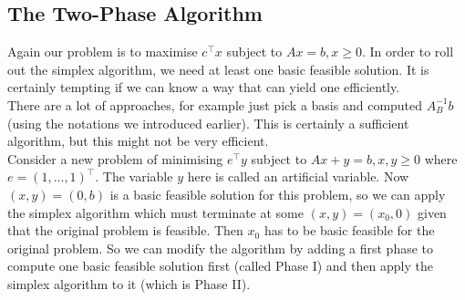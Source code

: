 \subsection{The Two-Phase Algorithm}
Again our problem is to maximise $c^\top x$ subject to $Ax=b,x\ge 0$.
In order to roll out the simplex algorithm, we need at least one basic feasible solution.
It is certainly tempting if we can know a way that can yield one efficiently.\\
There are a lot of approaches, for example just pick a basis and computed $A_B^{-1}b$ (using the notations we introduced earlier).
This is certainly a sufficient algorithm, but this might not be very efficient.\\
Consider a new problem of minimising $e^\top y$ subject to $Ax+y=b,x,y\ge 0$ where $e=(1,\ldots,1)^\top$.
The variable $y$ here is called an artificial variable.
Now $(x,y)=(0,b)$ is a basic feasible solution for this problem, so we can apply the simplex algorithm which must terminate at some $(x,y)=(x_0,0)$ given that the original problem is feasible.
Then $x_0$ has to be basic feasible for the original problem.
So we can modify the algorithm by adding a first phase to compute one basic feasible solution first (called Phase I) and then apply the simplex algorithm to it (which is Phase II).
